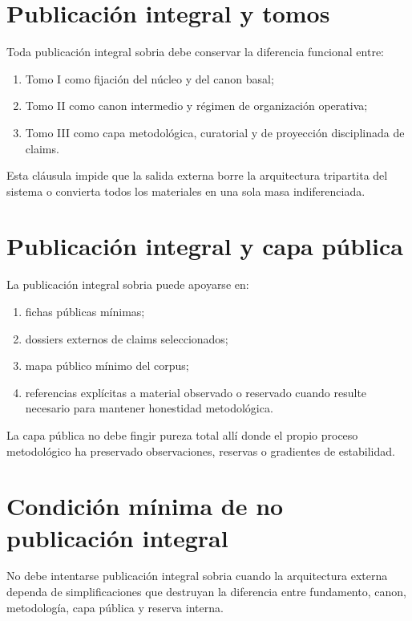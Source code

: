 \section{Publicación integral y tomos}
\begin{definition}
Toda publicación integral sobria debe conservar la diferencia funcional entre:
\begin{enumerate}
  \item Tomo I como fijación del núcleo y del canon basal;
  \item Tomo II como canon intermedio y régimen de organización operativa;
  \item Tomo III como capa metodológica, curatorial y de proyección disciplinada de claims.
\end{enumerate}
\end{definition}

\begin{observation}
Esta cláusula impide que la salida externa borre la arquitectura tripartita del sistema o convierta todos los materiales en una sola masa indiferenciada.
\end{observation}

\section{Publicación integral y capa pública}
\begin{definition}
La publicación integral sobria puede apoyarse en:
\begin{enumerate}
  \item fichas públicas mínimas;
  \item dossiers externos de claims seleccionados;
  \item mapa público mínimo del corpus;
  \item referencias explícitas a material observado o reservado cuando resulte necesario para mantener honestidad metodológica.
\end{enumerate}
\end{definition}

\begin{observation}
La capa pública no debe fingir pureza total allí donde el propio proceso metodológico ha preservado observaciones, reservas o gradientes de estabilidad.
\end{observation}

\section{Condición mínima de no publicación integral}
\begin{definition}
No debe intentarse publicación integral sobria cuando la arquitectura externa dependa de simplificaciones que destruyan la diferencia entre fundamento, canon, metodología, capa pública y reserva interna.
\end{definition}

